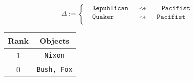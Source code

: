 \begin{equation*}
    \Delta := \left\{
    \begin{aligned}
         & \texttt{Republican} &  & \rightsquigarrow &  & \neg\texttt{Pacifist} \\
         & \texttt{Quaker}     &  & \rightsquigarrow &  & \texttt{Pacifist}     \\
    \end{aligned}
    \right.
\end{equation*}

\begin{table}[h]
    \centering
    \begin{tabular}{|c|c|}
        \hline
        \textbf{Rank} & \textbf{Objects}   \\
        \hline
        1             & \texttt{Nixon}     \\
        \hline
        0             & \texttt{Bush, Fox} \\
        \hline
    \end{tabular}
\end{table}